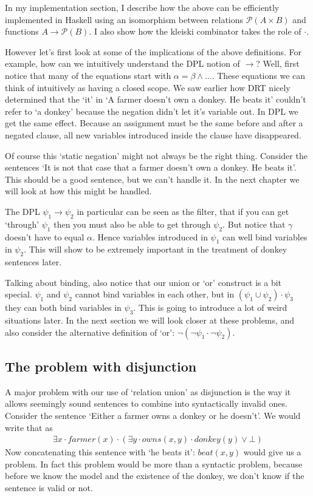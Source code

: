 \documentclass[12pt]{article}
\begin{document}
In my implementation section, I describe how the above can be efficiently implemented in Haskell using an isomorphism between relations $\mathcal{P}(A\times B)$ and functions $A\to\mathcal{P}(B)$. I also show how the kleiski combinator takes the role of $\cdot$.

However let's first look at some of the implications of the above definitions. For example, how can we intuitively understand the DPL notion of $\rightarrow$? Well, first notice that many of the equations start with $\alpha=\beta\wedge\dots$. These equations we can think of intuitively as having a closed scope. We saw earlier how DRT nicely determined that the `it' in `A farmer doesn't own a donkey. He beats it' couldn't refer to `a donkey' because the negation didn't let it's variable out. In DPL we get the same effect. Because an assignment must be the same before and after a negated clause, all new variables introduced inside the clause have disappeared.

Of course this `static negation' might not always be the right thing. Consider the sentences `It is not that case that a farmer doesn't own a donkey. He beats it'. This should be a good sentence, but we can't handle it. In the next chapter we will look at how this might be handled.

The DPL $\psi_1\rightarrow\psi_2$ in particular can be seen as the filter, that if you can get `through' $\psi_1$ then you must also be able to get through $\psi_2$. But notice that $\gamma$ doesn't have to equal $\alpha$. Hence variables introduced in $\psi_1$ can well bind variables in $\psi_2$. This will show to be extremely important in the treatment of donkey sentences later.

Talking about binding, also notice that our union or `or' construct is a bit special. $\psi_1$ and $\psi_2$ cannot bind variables in each other, but in $(\psi_1\cup\psi_2)\cdot\psi_3$ they can both bind variables in $\psi_3$. This is going to introduce a lot of weird situations later. In the next section we will look closer at these problems, and also consider the alternative definition of `or': $\neg(\neg\psi_1\cdot\neg\psi_2)$.

\subsection{The problem with disjunction}

A major problem with our use of `relation union' as disjunction is the way it allows seemingly sound sentences to combine into syntactically invalid ones. Consider the sentence `Either a farmer owns a donkey or he doesn't'. We would write that as
\begin{align}
\exists x\cdot farmer(x)\cdot(\exists y\cdot owns(x,y)\cdot donkey(y)\vee \bot) \label{owns_donkey_or_not}
\end{align}
Now concatenating this sentence with `he beats it': $beat(x,y)$ would give us a problem. In fact this problem would be more than a syntactic problem, because before we know the model and the existence of the donkey, we don't know if the sentence is valid or not.
\end{document}
